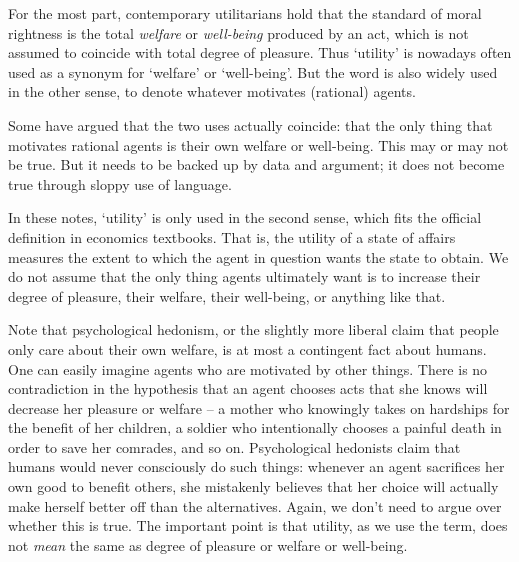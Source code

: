 For the most part, contemporary utilitarians hold that the standard of
moral rightness is the total \emph{welfare} or \emph{well-being}
produced by an act, which is not assumed to coincide with total degree
of pleasure. Thus `utility' is nowadays often used as a synonym for
`welfare' or `well-being'. But the word is also widely used in the
other sense, to denote whatever motivates (rational) agents.

Some have argued that the two uses actually coincide: that the only
thing that motivates rational agents is their own welfare or
well-being. This may or may not be true. But it needs to be backed up
by data and argument; it does not become true through sloppy use of
language.

In these notes, `utility' is only used in the second sense, which fits
the official definition in economics textbooks. That is, the utility
of a state of affairs measures the extent to which the agent in
question wants the state to obtain. We do not assume that the only
thing agents ultimately want is to increase their degree of pleasure,
their welfare, their well-being, or anything like that.


Note that psychological hedonism, or the slightly more liberal claim
that people only care about their own welfare, is at most a contingent
fact about humans. One can easily imagine agents who are motivated by
other things. There is no contradiction in the hypothesis that an
agent chooses acts that she knows will decrease her pleasure or
welfare -- a mother who knowingly takes on hardships for the benefit
of her children, a soldier who intentionally chooses a painful death
in order to save her comrades, and so on. Psychological hedonists
claim that humans would never consciously do such things: whenever an
agent sacrifices her own good to benefit others, she mistakenly
believes that her choice will actually make herself better off than
the alternatives. Again, we don't need to argue over whether this is
true. The important point is that utility, as we use the term, does
not \emph{mean} the same as degree of pleasure or welfare or
well-being.

